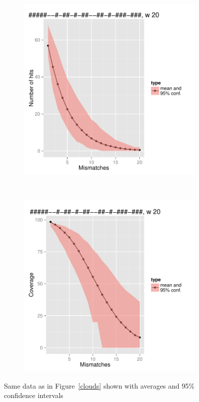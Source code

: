 \begin{figure}
	\begin{subfigure}[b]{0.47\textwidth}
		\includegraphics[width=\textwidth]{images/3.3/Myco-w20-spaced-hit-confidence.pdf}
		\label{weight-20-spaced-hit-confidence}
	\end{subfigure}
	~
	\begin{subfigure}[b]{0.47\textwidth}
		\includegraphics[width=\textwidth]{images/3.3/Myco-w20-spaced-cover-confidence.pdf}
		\label{weight-20-spaced-cover-confidence}
	\end{subfigure}

	\caption{Same data as in Figure~\ref{clouds} shown 	with averages and
	95\% confidence intervals \label{clouds-conf}}
\end{figure}

